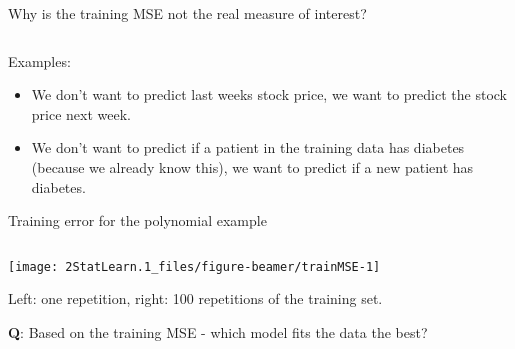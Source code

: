 \documentclass[ignorenonframetext,]{beamer}
\begin{document}
\begin{frame}

Why is the training MSE not the real measure of interest?

\(~\)

Examples:

\begin{itemize}
\item
  We don't want to predict last weeks stock price, we want to predict
  the stock price next week.
\item
  We don't want to predict if a patient in the training data has
  diabetes (because we already know this), we want to predict if a new
  patient has diabetes.
\end{itemize}

\end{frame}

\begin{frame}

\begin{block}{Training error for the polynomial example}

\(~\)

\begin{center}\texttt{[image: 2StatLearn.1\_files/figure-beamer/trainMSE-1]} \end{center}

\vspace{2mm}

Left: one repetition, right: 100 repetitions of the training set.

\vspace{2mm}

\textbf{Q}: Based on the training MSE - which model fits the data the
best?

\end{block}

\end{frame}
\end{document}
